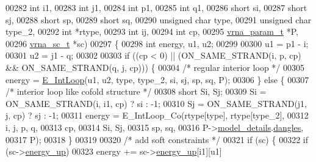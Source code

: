 \begin{DoxyCode}
00282                   \textcolor{keywordtype}{int}           i1,
00283                   \textcolor{keywordtype}{int}           j1,
00284                   \textcolor{keywordtype}{int}           p1,
00285                   \textcolor{keywordtype}{int}           q1,
00286                   \textcolor{keywordtype}{short}         si,
00287                   \textcolor{keywordtype}{short}         sj,
00288                   \textcolor{keywordtype}{short}         sp,
00289                   \textcolor{keywordtype}{short}         sq,
00290                   \textcolor{keywordtype}{unsigned} \textcolor{keywordtype}{char} type,
00291                   \textcolor{keywordtype}{unsigned} \textcolor{keywordtype}{char} type\_2,
00292                   \textcolor{keywordtype}{int}           *rtype,
00293                   \textcolor{keywordtype}{int}           ij,
00294                   \textcolor{keywordtype}{int}           cp,
00295                   \hyperlink{group__energy__parameters_structvrna__param__s}{vrna\_param\_t}  *P,
00296                   \hyperlink{group__soft__constraints_structvrna__sc__s}{vrna\_sc\_t}     *sc)
00297 \{
00298   \textcolor{keywordtype}{int} energy, u1, u2;
00299 
00300   u1  = p1 - i;
00301   u2  = j1 - q;
00302 
00303   \textcolor{keywordflow}{if} ((cp < 0) || (ON\_SAME\_STRAND(i, p, cp) && ON\_SAME\_STRAND(q, j, cp))) \{
00304     \textcolor{comment}{/* regular interior loop */}
00305     energy = \hyperlink{group__eval__deprecated_gaafbc187b7f78e8e82afb77dd6f3b8fc5}{E\_IntLoop}(u1, u2, type, type\_2, si, sj, sp, sq, P);
00306   \} \textcolor{keywordflow}{else} \{
00307     \textcolor{comment}{/* interior loop like cofold structure */}
00308     \textcolor{keywordtype}{short} Si, Sj;
00309     Si      = ON\_SAME\_STRAND(i, i1, cp) ? si : -1;
00310     Sj      = ON\_SAME\_STRAND(j1, j, cp) ? sj : -1;
00311     energy  = E\_IntLoop\_Co(rtype[type], rtype[type\_2],
00312                            i, j, p, q,
00313                            cp,
00314                            Si, Sj,
00315                            sp, sq,
00316                            P->\hyperlink{group__energy__parameters_a7b84353eb9075c595bad4ceb871bcae7}{model\_details}.\hyperlink{group__model__details_adcda4ff2ea77748ae0e8700288282efc}{dangles},
00317                            P);
00318   \}
00319 
00320   \textcolor{comment}{/* add soft constraints */}
00321   \textcolor{keywordflow}{if} (sc) \{
00322     \textcolor{keywordflow}{if} (sc->\hyperlink{group__soft__constraints_a57e4dbb924ab11f304e3762a3a9b07a1}{energy\_up})
00323       energy += sc->\hyperlink{group__soft__constraints_a57e4dbb924ab11f304e3762a3a9b07a1}{energy\_up}[i1][u1]

\end{DoxyCode}
